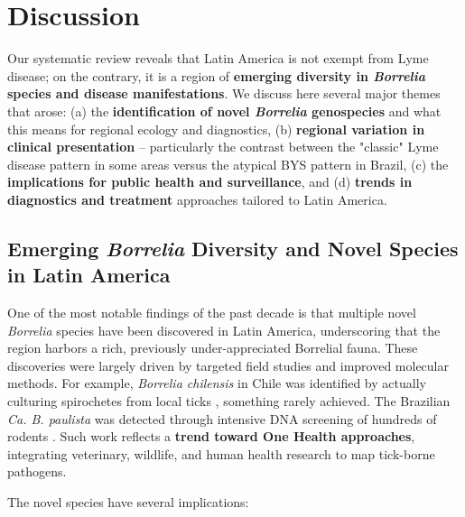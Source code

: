 \documentclass[11pt,letterpaper]{article}
\begin{document}
\section{Discussion}
Our systematic review reveals that Latin America is not exempt from Lyme disease; on the contrary, it is a region of \textbf{emerging diversity in \textit{Borrelia} species and disease manifestations}. We discuss here several major themes that arose: (a) the \textbf{identification of novel \textit{Borrelia} genospecies} and what this means for regional ecology and diagnostics, (b) \textbf{regional variation in clinical presentation} – particularly the contrast between the "classic" Lyme disease pattern in some areas versus the atypical BYS pattern in Brazil, (c) the \textbf{implications for public health and surveillance}, and (d) \textbf{trends in diagnostics and treatment} approaches tailored to Latin America.

\subsection{Emerging \textit{Borrelia} Diversity and Novel Species in Latin America}
One of the most notable findings of the past decade is that multiple novel \textit{Borrelia} species have been discovered in Latin America, underscoring that the region harbors a rich, previously under-appreciated Borrelial fauna. These discoveries were largely driven by targeted field studies and improved molecular methods. For example, \textit{Borrelia chilensis} in Chile was identified by actually culturing spirochetes from local ticks \citep{Ivanova2014f}, something rarely achieved. The Brazilian \textit{Ca. B. paulista} was detected through intensive DNA screening of hundreds of rodents \citep{Weck2022i}. Such work reflects a \textbf{trend toward One Health approaches}, integrating veterinary, wildlife, and human health research to map tick-borne pathogens.

The novel species have several implications:
\end{document}
